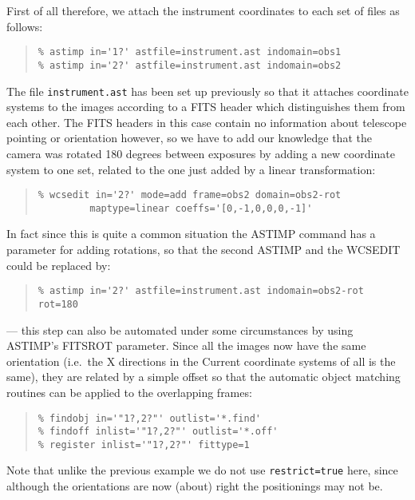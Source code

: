 \documentclass[twoside,11pt]{article}
\newcommand{\htmlref}[2]{#1}
\renewcommand{\_}{\texttt{\symbol{95}}}
\newenvironment{myquote}{\begin{quote}\begin{small}}{\end{small}\end{quote}}
\newcommand{\text}[1]{{\small \tt #1}}
\newcommand{\routine}[1]{{\sc #1}}
\newcommand{\xroutine}[1]{\htmlref{{\sc #1}}{#1}}
\begin{document}
First of all therefore, we attach the instrument coordinates
to each set of files as follows:
\begin{myquote}
\begin{verbatim}
% astimp in='1?' astfile=instrument.ast indomain=obs1 
% astimp in='2?' astfile=instrument.ast indomain=obs2
\end{verbatim}
\end{myquote}
The file \text{instrument.ast} has been set up previously so that
it attaches coordinate systems to the images according to 
a FITS header which distinguishes them from each other.
The FITS headers in this case contain no information about 
telescope pointing or orientation however, so we have to add
our knowledge that the camera was rotated 180 degrees between
exposures by adding a new coordinate system to one set, 
related to the one just added by a linear transformation:
\begin{myquote}
\begin{verbatim}
% wcsedit in='2?' mode=add frame=obs2 domain=obs2-rot 
         maptype=linear coeffs='[0,-1,0,0,0,-1]'
\end{verbatim}
\end{myquote}
In fact since this is quite a common situation the \xroutine{ASTIMP}
command has a parameter for adding rotations, so that the second
ASTIMP and the WCSEDIT could be replaced by:
\begin{myquote}
\begin{verbatim}
% astimp in='2?' astfile=instrument.ast indomain=obs2-rot rot=180
\end{verbatim}
\end{myquote}
--- this step can also be automated under some circumstances by using 
\routine{ASTIMP}'s FITSROT parameter.
Since all the images now have the same orientation 
(i.e.\ the X directions in the Current coordinate systems of all is the same), 
they are related
by a simple offset so that the automatic object matching routines
can be applied to the overlapping frames:
\begin{myquote}
\begin{verbatim}
% findobj in='"1?,2?"' outlist='*.find'
% findoff inlist='"1?,2?"' outlist='*.off'
% register inlist='"1?,2?"' fittype=1
\end{verbatim}
\end{myquote}
Note that unlike the previous example we do not use {\tt restrict=true} here,
since although the orientations are now (about) right 
the positionings may not be.
\end{document}
